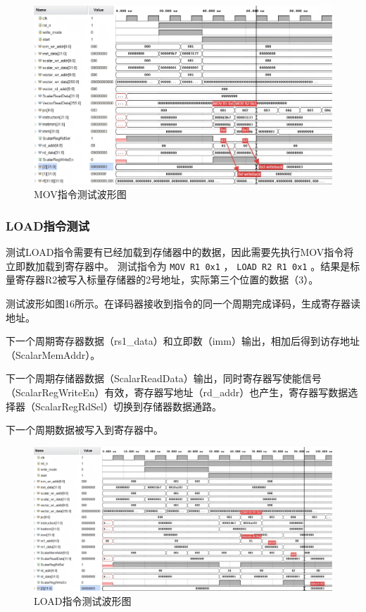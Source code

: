 \documentclass[UTF8]{ctexart}
\begin{document}
\begin{figure}[htbp]
    \centering
    \includegraphics[width=16cm]{pic/VPU_MOV(1).png}
    \caption{MOV指令测试波形图}
\end{figure}

\subsubsection{LOAD指令测试}

测试LOAD指令需要有已经加载到存储器中的数据，因此需要先执行MOV指令将立即数加载到寄存器中。
测试指令为 \verb|MOV R1 0x1| ， \verb|LOAD R2 R1 0x1| 。结果是标量寄存器R2被写入标量存储器的2号地址，实际第三个位置的数据（3）。

测试波形如图16所示。在译码器接收到指令的同一个周期完成译码，生成寄存器读地址。

下一个周期寄存器数据（rs1\_data）和立即数（imm）输出，相加后得到访存地址\\（ScalarMemAddr）。

下一个周期存储器数据（ScalarReadData）输出，同时寄存器写使能信号（ScalarRegWriteEn）有效，寄存器写地址（rd\_addr）也产生，寄存器写数据选择器（ScalarRegRdSel）切换到存储器数据通路。

下一个周期数据被写入到寄存器中。

\begin{figure}[htbp]
    \centering
    \includegraphics[width=16cm]{pic/VPU_LOAD(1).png}
    \caption{LOAD指令测试波形图}
\end{figure}
\end{document}
